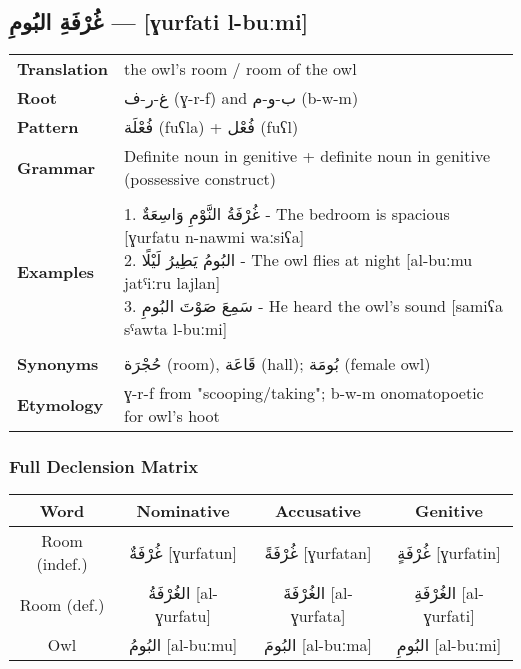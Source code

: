 \documentclass[letter,12pt]{article}
\begin{document}
\subsection{\textarabic{غُرْفَةِ البُومِ} — [ɣurfati l-buːmi]}
\begin{tabular}{p{3cm}p{10cm}}
\toprule
\textbf{Translation} & the owl's room / room of the owl \\
\textbf{Root} & \textarabic{غ-ر-ف} (ɣ-r-f) and \textarabic{ب-و-م} (b-w-m) \\
\textbf{Pattern} & \textarabic{فُعْلَة} (fuʕla) + \textarabic{فُعْل} (fuʕl) \\
\textbf{Grammar} & Definite noun in genitive + definite noun in genitive (possessive construct) \\
\midrule \\
\textbf{Examples} & \makecell[l]{\parbox{9.5cm}{
1. \textarabic{غُرْفَةُ النَّوْمِ وَاسِعَةٌ} - The bedroom is spacious [ɣurfatu n-nawmi waːsiʕa]\\
2. \textarabic{البُومُ يَطِيرُ لَيْلًا} - The owl flies at night [al-buːmu jatˤiːru lajlan]\\
3. \textarabic{سَمِعَ صَوْتَ البُومِ} - He heard the owl's sound [samiʕa sˤawta l-buːmi]
}} \\
\midrule \\
\textbf{Synonyms} & \textarabic{حُجْرَة} (room), \textarabic{قَاعَة} (hall); \textarabic{بُومَة} (female owl) \\
\textbf{Etymology} & ɣ-r-f from "scooping/taking"; b-w-m onomatopoetic for owl's hoot \\
\bottomrule
\end{tabular}

\subsubsection*{Full Declension Matrix}
\begin{tabular}{|c|c|c|c|}
\hline
\textbf{Word} & \textbf{Nominative} & \textbf{Accusative} & \textbf{Genitive} \\
\hline
Room (indef.) & \textarabic{غُرْفَةٌ} [ɣurfatun] & \textarabic{غُرْفَةً} [ɣurfatan] & \textarabic{غُرْفَةٍ} [ɣurfatin] \\
\hline
Room (def.) & \textarabic{الغُرْفَةُ} [al-ɣurfatu] & \textarabic{الغُرْفَةَ} [al-ɣurfata] & \textarabic{الغُرْفَةِ} [al-ɣurfati] \\
\hline
Owl & \textarabic{البُومُ} [al-buːmu] & \textarabic{البُومَ} [al-buːma] & \textarabic{البُومِ} [al-buːmi] \\
\hline
\end{tabular}
\end{document}
